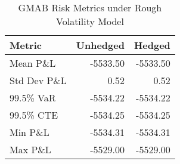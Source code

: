 
\begin{table}[h]
\centering
\caption{GMAB Risk Metrics under Rough Volatility Model}
\label{tab:gmab_roughvol_results}
\begin{tabular}{lrr}
\toprule
Metric & Unhedged & Hedged \\
\midrule
Mean P\&L & -5533.50 & -5533.50 \\
Std Dev P\&L & 0.52 & 0.52 \\
99.5\% VaR & -5534.22 & -5534.22 \\
99.5\% CTE & -5534.25 & -5534.25 \\
Min P\&L & -5534.31 & -5534.31 \\
Max P\&L & -5529.00 & -5529.00 \\
\bottomrule
\end{tabular}
\end{table}
